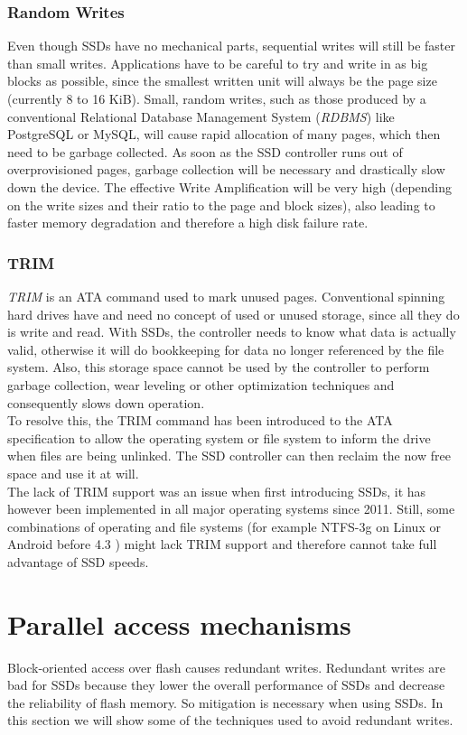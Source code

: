 \documentclass{acm_proc_article-sp}
\begin{document}
\subsubsection*{Random Writes}
Even though SSDs have no mechanical parts, sequential writes will still be faster than small writes. Applications have to be careful to try and write in as big blocks as possible, since the smallest written unit will always be the page size (currently 8 to 16 KiB). Small, random writes, such as those produced by a conventional Relational Database Management System (\emph{RDBMS}) like PostgreSQL or MySQL, will cause rapid allocation of many pages, which then need to be garbage collected. As soon as the SSD controller runs out of overprovisioned pages, garbage collection will be necessary and drastically slow down the device. The effective Write Amplification will be very high (depending on the write sizes and their ratio to the page and block sizes), also leading to faster memory degradation and therefore a high disk failure rate.

\subsubsection*{TRIM}
\emph{TRIM} is an ATA command used to mark unused pages. Conventional spinning hard drives have and need no concept of used or unused storage, since all they do is write and read. With SSDs, the controller needs to know what data is actually valid, otherwise it will do bookkeeping for data no longer referenced by the file system. Also, this storage space cannot be used by the controller to perform garbage collection, wear leveling or other optimization techniques and consequently slows down operation.
\\
To resolve this, the TRIM command has been introduced to the ATA specification to allow the operating system or file system to inform the drive when files are being unlinked. The SSD controller can then reclaim the now free space and use it at will.
\\
The lack of TRIM support was an issue when first introducing SSDs, it has however been implemented in all major operating systems since 2011. Still, some combinations of operating and file systems (for example NTFS-3g on Linux or Android before 4.3 \cite{androidtrim}) might lack TRIM support and therefore cannot take full advantage of SSD speeds.

\section{Parallel access mechanisms}
Block-oriented access over flash causes redundant writes. Redundant writes are bad for SSDs because they lower the overall performance of SSDs and decrease the reliability of flash memory. So mitigation is necessary when using SSDs. In this section we will show some of the techniques used to avoid redundant writes.
\end{document}
